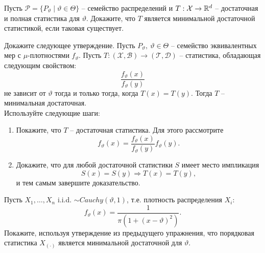 \begin{exc}
	Пусть $\mathcal{P}= \{ P_\vartheta \mid \vartheta \in \Theta \}$ -- семейство распределений и $T:\mathcal{X} \rightarrow \mathbb{R}^d$ -- достаточная и полная статистика для $\vartheta$. Докажите, что $T$ является минимальной достаточной статистикой, если таковая существует.
\end{exc}

\begin{exc}
	Докажите следующее утверждение. Пусть $P_\vartheta,\ \vartheta \in \Theta$ -- семейство эквивалентных мер с $\mu$-плотностями $f_\vartheta$. Пусть $T: (\mathcal{X}, \mathcal{B}) \rightarrow (\mathcal{T}, \mathcal{D})$ -- статистика, обладающая следующим свойством:
	\[\frac{f_\vartheta(x)}{f_\vartheta(y)} \]
	не зависит от $\vartheta$ тогда и только тогда, когда $T(x) = T(y)$. Тогда $T$ -- минимальная достаточная. \\
	Используйте следующие шаги:
	\begin{enumerate}
		\item Покажите, что $T$ -- достаточная статистика. Для этого рассмотрите
		\[f_\vartheta(x) = \frac{f_\vartheta(x)}{f_\vartheta(y)} f_\vartheta(y). \]
		\item Докажите, что для любой достаточной статистики $S$ имеет место импликация
		\[ S(x) = S(y) \Longrightarrow T(x) = T(y), \]
		и тем самым завершите доказательство.
	\end{enumerate}
\end{exc}

\begin{exc}
	Пусть $X_1, \dots, X_n$ i.i.d. $\sim Cauchy(\vartheta, 1)$, т.е. плотность распределения $X_i$:
	\[ f_\vartheta(x) = \frac{1}{\pi (1 + (x-\vartheta)^2)}. \]
	Покажите, используя утверждение из предыдущего упражнения, что порядковая статистика $X_{(\cdot)}$ является минимальной достаточной для $\vartheta$.
\end{exc}